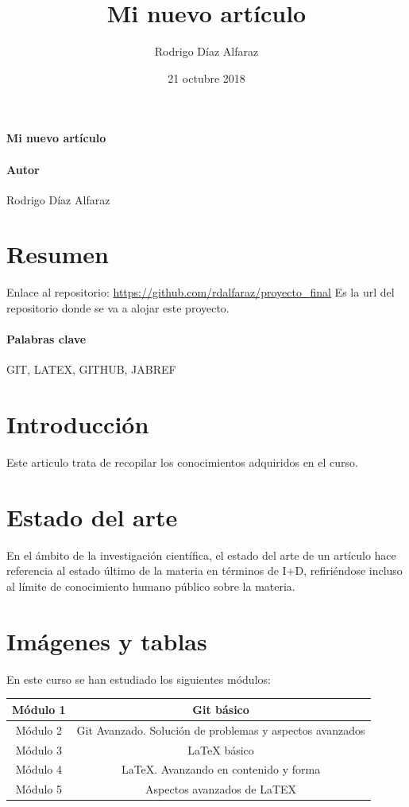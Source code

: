 \documentclass[a4paper,11pt]{article}
\begin{document}
\title{Mi nuevo artículo} 
\author{Rodrigo Díaz Alfaraz}
\date{21 octubre 2018}
\maketitle

\paragraph*{Mi nuevo artículo}

\paragraph*{Autor}
Rodrigo Díaz Alfaraz

\section*{Resumen} 
Enlace al repositorio:
\url{https://github.com/rdalfaraz/proyecto_final} Es la url del repositorio donde se va a alojar este proyecto.
\paragraph*{Palabras clave}

GIT, LATEX, GITHUB, JABREF

\section*{Introducción}
Este articulo trata de recopilar los conocimientos adquiridos en el curso. 

\section*{Estado del arte}
\cite{Espanola2015a}
En el ámbito de la investigación científica, el estado del arte de un artículo hace referencia al estado último de la materia en términos de I+D, refiriéndose incluso al límite de conocimiento humano público sobre la materia.

\section*{Imágenes y tablas}
En este curso se han estudiado los siguientes módulos:

\begin{table}
\centering
\begin{tabular}{|c|c|}
\hline
Módulo 1 & Git básico \\
\hline
Módulo 2 & Git Avanzado. Solución de problemas y aspectos avanzados \\
\hline
Módulo 3 & LaTeX básico \\
\hline
Módulo 4 & LaTeX. Avanzando en contenido y forma \\
\hline
Módulo 5 & Aspectos avanzados de LaTEX \\
\hline
\end{tabular}
\end{table}
\end{document}
